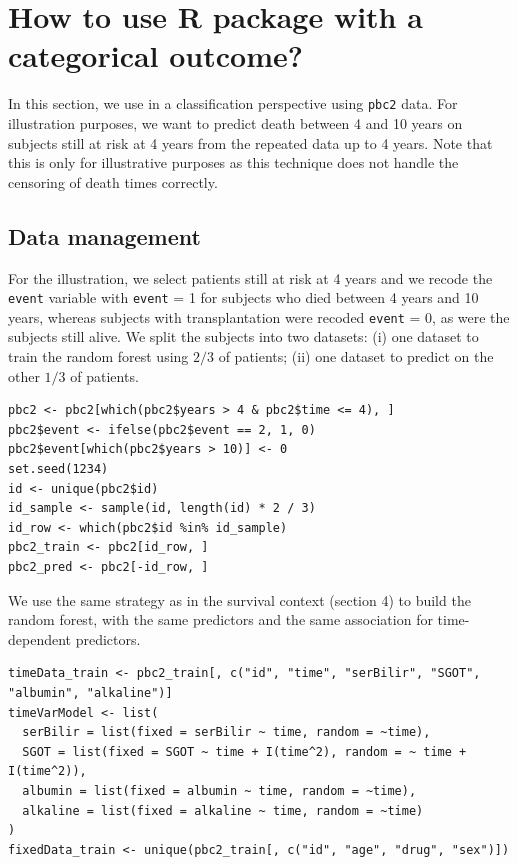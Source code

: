 \section{\texorpdfstring{How to use  R package with a categorical outcome?}{How to use  R package with a categorical outcome?}}\label{how-to-use-r-package-with-a-categorical-outcome}

In this section, we use  in a classification perspective using \texttt{pbc2} data. For illustration purposes, we want to predict death between 4 and 10 years on subjects still at risk at 4 years from the repeated data up to 4 years. Note that this is only for illustrative purposes as this technique does not handle the censoring of death times correctly.

\subsection{Data management}\label{data-management-1}

For the illustration, we select patients still at risk at 4 years and we recode the \texttt{event} variable with \texttt{event} = 1 for subjects who died between 4 years and 10 years, whereas subjects with transplantation were recoded \texttt{event} = 0, as were the subjects still alive. We split the subjects into two datasets: (i) one dataset to train the random forest using \(2/3\) of patients; (ii) one dataset to predict on the other \(1/3\) of patients.

\begin{verbatim}
pbc2 <- pbc2[which(pbc2$years > 4 & pbc2$time <= 4), ]
pbc2$event <- ifelse(pbc2$event == 2, 1, 0)
pbc2$event[which(pbc2$years > 10)] <- 0
set.seed(1234)
id <- unique(pbc2$id)
id_sample <- sample(id, length(id) * 2 / 3)
id_row <- which(pbc2$id %in% id_sample)
pbc2_train <- pbc2[id_row, ]
pbc2_pred <- pbc2[-id_row, ]
\end{verbatim}

We use the same strategy as in the survival context (section 4) to build the random forest, with the same predictors and the same association for time-dependent predictors.

\begin{verbatim}
timeData_train <- pbc2_train[, c("id", "time", "serBilir", "SGOT", "albumin", "alkaline")]
timeVarModel <- list(
  serBilir = list(fixed = serBilir ~ time, random = ~time),
  SGOT = list(fixed = SGOT ~ time + I(time^2), random = ~ time + I(time^2)),
  albumin = list(fixed = albumin ~ time, random = ~time),
  alkaline = list(fixed = alkaline ~ time, random = ~time)
)
fixedData_train <- unique(pbc2_train[, c("id", "age", "drug", "sex")])
\end{verbatim}

